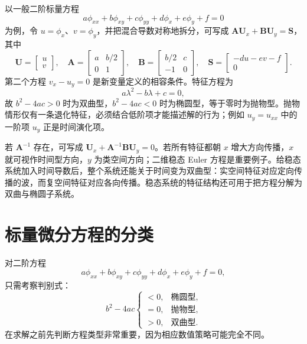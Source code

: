 \documentclass[11pt,a4paper,openany,fontset=none]{ctexbook}
\begin{document}
以一般二阶标量方程
\begin{equation}
 a\phi_{xx}+b\phi_{xy}+c\phi_{yy}+d\phi_x+e\phi_y+f=0 \tag{1.16.27}
\end{equation}
为例，令 $u=\phi_x$、$v=\phi_y$，并把混合导数对称地拆分，可写成 $\bm A\bm U_x+\bm B\bm U_y=\bm S$，其中
\begin{equation}
 \bm U=\begin{bmatrix}u\\v\end{bmatrix},\quad
 \bm A=\begin{bmatrix}a&b/2\\0&1\end{bmatrix},\quad
 \bm B=\begin{bmatrix}b/2&c\\-1&0\end{bmatrix},\quad
 \bm S=\begin{bmatrix}-du-ev-f\\0\end{bmatrix}. \tag{1.16.30}
\end{equation}
第二个方程 $v_x-u_y=0$ 是新变量定义的相容条件。特征方程为
\begin{equation}
 a\lambda^2-b\lambda+c=0, \tag{1.16.33}
\end{equation}
故 $b^2-4ac>0$ 时为双曲型，$b^2-4ac<0$ 时为椭圆型，等于零时为抛物型。抛物情形仅有一条退化特征，必须结合低阶项才能描述解的行为；例如 $u_y=u_{xx}$ 中的一阶项 $u_y$ 正是时间演化项。

若 $\bm A^{-1}$ 存在，可写成 $\bm U_x+\bm A^{-1}\bm B\bm U_y=0$。若所有特征都朝 $x$ 增大方向传播，$x$ 就可视作时间型方向，$y$ 为类空间方向；二维稳态 Euler 方程是重要例子。给稳态系统加入时间导数后，整个系统还能关于时间变为双曲型：实空间特征对应定向传播的波，而复空间特征对应各向传播。稳态系统的特征结构还可用于把方程分解为双曲与椭圆子系统。

\section{标量微分方程的分类}

对二阶方程
\begin{equation}
 a\phi_{xx}+b\phi_{xy}+c\phi_{yy}+d\phi_x+e\phi_y+f=0, \tag{1.17.1}
\end{equation}
只需考察判别式：
\begin{equation}
 b^2-4ac\begin{cases}<0,&\text{椭圆型},\\=0,&\text{抛物型},\\>0,&\text{双曲型}.\end{cases} \tag{1.17.2}
\end{equation}
在求解之前先判断方程类型非常重要，因为相应数值策略可能完全不同。
\end{document}
